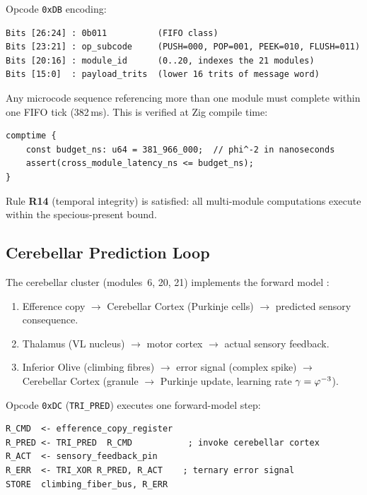 Opcode \texttt{0xDB} encoding:
\begin{verbatim}
Bits [26:24] : 0b011          (FIFO class)
Bits [23:21] : op_subcode     (PUSH=000, POP=001, PEEK=010, FLUSH=011)
Bits [20:16] : module_id      (0..20, indexes the 21 modules)
Bits [15:0]  : payload_trits  (lower 16 trits of message word)
\end{verbatim}

Any microcode sequence referencing more than one module must complete within one
FIFO tick (382\,ms).  This is verified at Zig compile time:
\begin{verbatim}
comptime {
    const budget_ns: u64 = 381_966_000;  // phi^-2 in nanoseconds
    assert(cross_module_latency_ns <= budget_ns);
}
\end{verbatim}

Rule \textbf{R14} (temporal integrity) is satisfied: all multi-module
computations execute within the specious-present bound.

\subsection{Cerebellar Prediction Loop}
\label{ssec:flos73-cerebellum}

The cerebellar cluster (modules~6, 20, 21) implements the forward model
\cite{nguyen_person_2025}:
\begin{enumerate}
  \item Efference copy $\to$ Cerebellar Cortex (Purkinje cells) $\to$ predicted
    sensory consequence.
  \item Thalamus (VL nucleus) $\to$ motor cortex $\to$ actual sensory feedback.
  \item Inferior Olive (climbing fibres) $\to$ error signal (complex spike) $\to$
    Cerebellar Cortex (granule $\to$ Purkinje update, learning rate
    $\gamma = \varphi^{-3}$).
\end{enumerate}

Opcode \texttt{0xDC} (\texttt{TRI\_PRED}) executes one forward-model step:
\begin{verbatim}
R_CMD  <- efference_copy_register
R_PRED <- TRI_PRED  R_CMD           ; invoke cerebellar cortex
R_ACT  <- sensory_feedback_pin
R_ERR  <- TRI_XOR R_PRED, R_ACT    ; ternary error signal
STORE  climbing_fiber_bus, R_ERR
\end{verbatim}


